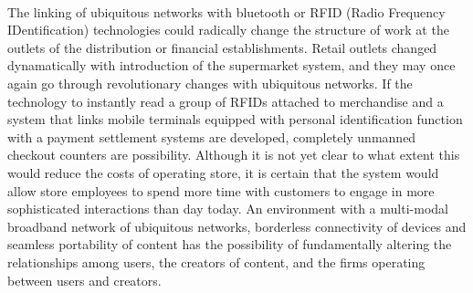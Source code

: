 \documentclass[12pt]{report}
\begin{document}
\\\hspace*{0.5in}The linking of ubiquitous networks with bluetooth or RFID (Radio Frequency IDentification) technologies could radically change the structure of work at the outlets of the distribution or financial establishments. Retail outlets changed dynamatically with introduction of the supermarket system, and they may once again go through revolutionary changes with ubiquitous networks. If the technology to instantly read a group of RFIDs attached to merchandise and a system that links mobile terminals equipped with personal identification function with a payment settlement systems are developed, completely unmanned checkout counters are possibility. Although it is not yet clear to what extent this would reduce the costs of operating store, it is certain that the system would allow store employees to spend more time with customers to engage in more sophisticated interactions than day today. An environment with a multi-modal broadband network of ubiquitous networks, borderless connectivity of devices and seamless portability of content has the possibility of fundamentally altering the relationships among users, the creators of content, and the firms operating between users and creators. \\
\end{document}
